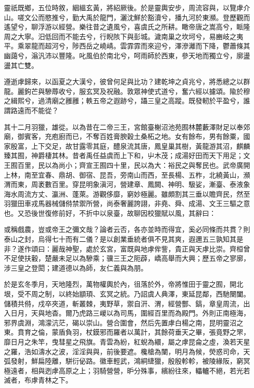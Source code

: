 \begin{pinyinscope}
靈祇既鄉，五位時敘，絪縕玄黃，將紹厥後。於是靈輿安步，周流容與，以覽虖介山。嗟文公而愍推兮，勤大禹於龍門，灑沈鮮於豁瀆兮，播九河於東瀕。登歷觀而遙望兮，聊浮游以經營。樂往昔之遺風兮，喜虞氏之所耕。瞰帝唐之嵩高兮，眽隆周之大寧。汨低回而不能去兮，行睨陔下與彭城。濊南巢之坎坷兮，易豳岐之夷平。乘翠龍而超河兮，陟西岳之嶢崝。雲霏霏而來迎兮，澤滲灕而下降，鬱蕭條其幽藹兮，滃汎沛以豐隆。叱風伯於南北兮，呵雨師於西東，參天地而獨立兮，廓盪盪其亡雙。

遵逝虖歸來，以函夏之大漢兮，彼曾何足與比功？建乾坤之貞兆兮，將悉總之以群龍。麗鉤芒與驂蓐收兮，服玄冥及祝融。敦眾神使式道兮，奮六經以攄頌。隃於穆之緝熙兮，過清廟之雝雝；軼五帝之遐跡兮，躡三皇之高蹤。既發軔於平盈兮，誰謂路遠而不能從？

其十二月羽獵，雄從。以為昔在二帝三王，宮館臺榭沼池苑囿林麓藪澤財足以奉郊廟，御賓客，充庖廚而已，不奪百姓膏腴穀土桑柘之地。女有餘布，男有餘粟，國家殷富，上下交足，故甘露零其庭，醴泉流其唐，鳳皇巢其樹，黃龍游其沼，麒麟臻其囿，神爵棲其林。昔者禹任益虞而上下和，屮木茂；成湯好田而天下用足；文王囿百里，民以為尚小；齊宣王囿四十里，民以為大：裕民之與奪民也。武帝廣開上林，南至宜春、鼎胡、御宿、昆吾，旁南山而西，至長楊、五柞，北繞黃山，瀕渭而東，周袤數百里。穿昆明象滇河，營建章、鳳闕、神明、馺娑，漸臺、泰液象海水周流方丈、瀛洲、蓬萊。游觀侈靡，窮妙極麗。雖頗割其三垂以贍齊民，然至羽獵田車戎馬器械儲偫禁禦所營，尚泰奢麗誇詡，非堯、舜、成湯、文王三驅之意也。又恐後世復修前好，不折中以泉臺，故聊因校獵賦以風，其辭曰：

或稱戲農，豈或帝王之彌文哉？論者云否，各亦並時而得宜，奚必同條而共貫？則泰山之封，烏得七十而有二儀？是以創業垂統者俱不見其爽，遐邇五三孰知其是非？遂作頌曰：麗哉神聖，處於玄宮，富既與地虖侔訾，貴正與天虖比崇。齊桓曾不足使扶轂，楚嚴未足以為驂乘；骥三王之阨薜，嶠高舉而大興；歷五帝之寥廓，涉三皇之登閎；建道德以為師，友仁義與為朋。

於是玄冬季月，天地隆烈，萬物權輿於內，徂落於外，帝將惟田于靈之囿，開北垠，受不周之制，以終始顓頊、玄冥之統。乃詔虞人典澤，東延昆鄰，西馳闛闔。儲積共偫，戍卒夾道，斬叢棘，夷野草，禦自汧、渭，經營酆、鎬，章皇周流，出入日月，天與地杳。爾乃虎路三嵕以為司馬，圍經百里而為殿門。外則正南極海，邪界虞淵，鴻濛沆茫，碣以崇山。營合圍會，然后先置虖白楊之南，昆明靈沼之東。賁育之倫，蒙盾負羽，杖鏌邪而羅者以萬計，其餘荷垂天之畢，張竟野之罘，靡日月之朱竿，曳彗星之飛旗。青雲為紛，紅蜺為繯，屬之虖昆侖之虛，渙若天星之羅，浩如濤水之波，淫淫與與，前後要遮。欃槍為闉，明月為候，熒惑司命，天弧發射，鮮扁陸離，駢衍佖路。徽車輕武，鴻絧緁獵，殷殷軫軫，被陵緣阪，窮冥極遠者，相與迾虖高原之上；羽騎營營，昈分殊事，繽紛往來，轠轤不絕，若光若滅者，布虖青林之下。


\end{pinyinscope}
